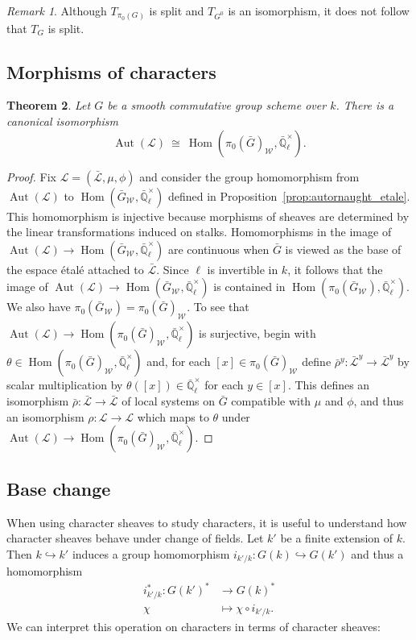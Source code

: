 \documentclass[10pt]{amsart}
\theoremstyle{plain}
\newtheorem{theorem}{Theorem}[section]
\theoremstyle{definition}
\theoremstyle{remark}
\newtheorem{remark}[theorem]{Remark}
\newcommand{\EE}{\mathbb{\bar Q}_\ell}
\newcommand{\Fq}{k}
\newcommand{\EEx}{\EE^\times}
\newcommand{\Weil}[1]{\mathcal{W}_{#1}}
\DeclareMathOperator{\Aut}{Aut}
\DeclareMathOperator{\Hom}{Hom}
\newcommand{\iso}{{\ \cong\ }}
\newcommand{\TrFrob}[1]{T_{#1}}
\newcommand{\cs}[1]{{\mathcal{#1}}}
\newcommand{\gcs}[1]{{\mathcal{\bar #1}}}
\newcommand{\bG}{\bar{G}}
\begin{document}
\begin{remark}
Although $\TrFrob{\pi_0(G)}$ is split and $\TrFrob{G^0}$ is an isomorphism, it does not follow that $\TrFrob{G}$ is split. 
\end{remark}

\subsection{Morphisms of characters} \label{ssec:CSmor}

\begin{theorem}\label{thm:autornaught}
Let $G$ be a smooth commutative group scheme over $\Fq$.
There is a canonical isomorphism
\[
\Aut(\cs{L}) \iso \Hom(\pi_0(\bG)_{\Weil{}},\EEx).
\]
\end{theorem}
\begin{proof} 
Fix $\cs{L} = (\gcs{L},\mu,\phi)$ and consider the group homomorphism from $\Aut(\cs{L})$ to $\Hom(\bG_{\Weil{}},\EEx)$ defined in Proposition~\ref{prop:autornaught_etale}.
This homomorphism is injective because morphisms of sheaves are determined by the linear transformations induced on stalks.  
Homomorphisms in the image of $\Aut(\cs{L}) \to \Hom(\bG_{\Weil{}},\EEx)$ are continuous when $\bG$ is viewed as the base of the espace \'etal\'e attached to $\gcs{L}$.
Since $\ell$ is invertible in $\Fq$, it follows that the image of $\Aut(\cs{L}) \to \Hom(\bG_{\Weil{}},\EEx)$ is contained in $\Hom(\pi_0(\bG_{\Weil{}}),\EEx)$. 
We also have $\pi_0(\bG_{\Weil{}})=\pi_0(\bG)_{\Weil{}}$. 
To see that $\Aut(\cs{L}) \to \Hom(\pi_0(\bG)_{\Weil{}},\EEx)$ is surjective, begin with $\theta\in\Hom(\pi_0(\bG)_{\Weil{}},\EEx)$ and, for each $[x] \in \pi_0(\bG)_{\Weil{}}$ define $\bar\rho^y: \gcs{L}^y \to \gcs{L}^y$ by scalar multiplication by $\theta([x])\in \EEx$ for each $y\in [x]$.
This defines an isomorphism $\bar\rho : \gcs{L}\to \gcs{L}$ of local systems on $\bG$ compatible with $\mu$ and $\phi$, and thus an isomorphism $\rho :\cs{L}\to \cs{L}$ which maps to $\theta$ under $\Aut(\cs{L}) \to \Hom(\pi_0(\bG)_{\Weil{}},\EEx)$.
\end{proof}

\subsection{Base change}\label{ssec:basechange}

When using character sheaves to study characters, it is useful to understand
how character sheaves behave under change of fields.
Let $k'$ be a finite extension of $k$. Then $k \hookrightarrow k'$ induces a group homomorphism
$i_{k'/k} : G(k) \hookrightarrow G(k')$ and thus a homomorphism
\begin{align*}
i_{k'/k}^* : G(k')^* &\to G(k)^* \\
\chi &\mapsto \chi\circ i_{k'/k}.
\end{align*}
We can interpret this operation on characters in terms of character sheaves:
\end{document}
